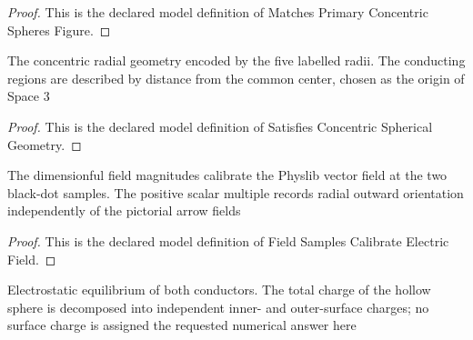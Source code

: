 \begin{proof}
  This is the declared model definition of Matches Primary Concentric Spheres Figure.
\end{proof}
\begin{definition}
  \label{def:physics:phyx-mini-0852:phyxminiproblems-problemphyxmini0852-satisfiesconcentricsphericalgeometry}
  The concentric radial geometry encoded by the five labelled radii. The conducting regions are described by distance from the common center, chosen as the origin of Space 3
\end{definition}
\begin{proof}
  This is the declared model definition of Satisfies Concentric Spherical Geometry.
\end{proof}
\begin{definition}
  \label{def:physics:phyx-mini-0852:phyxminiproblems-problemphyxmini0852-fieldsamplescalibrateelectricfield}
  The dimensionful field magnitudes calibrate the Physlib vector field at the two black-dot samples. The positive scalar multiple records radial outward orientation independently of the pictorial arrow fields
\end{definition}
\begin{proof}
  This is the declared model definition of Field Samples Calibrate Electric Field.
\end{proof}
\begin{definition}
  \label{def:physics:phyx-mini-0852:phyxminiproblems-problemphyxmini0852-satisfieselectrostaticconductorequilibrium}
  Electrostatic equilibrium of both conductors. The total charge of the hollow sphere is decomposed into independent inner- and outer-surface charges; no surface charge is assigned the requested numerical answer here
\end{definition}
